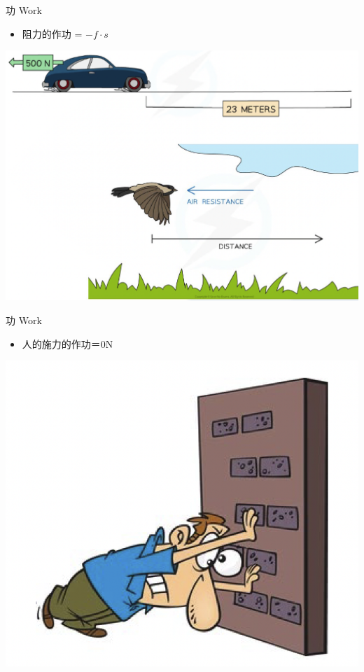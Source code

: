 \documentclass[beamer=true]{standalone}
\begin{document}
\begin{frame}{功 Work}
    \begin{itemize}
        \item 阻力的作功 = $-f\cdot s$
    \end{itemize}

    {\par\centering
    \includegraphics[width=.8\textwidth]{assets/f84b7953.png}
    \par}
\end{frame}
\begin{frame}{功 Work}
    \begin{itemize}
        \item 人的施力的作功＝0N
    \end{itemize}
    {\par\centering
    \includegraphics[width=.6\textwidth]{assets/5dba0df5.png}
    \par}
\end{frame}
\end{document}
